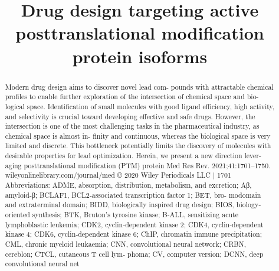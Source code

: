 \title{Drug design targeting active posttranslational modification protein isoforms}

\maketitle

\begin{abstract}
Modern drug design aims to discover novel lead com- pounds with attractable chemical profiles to enable further exploration of the intersection of chemical space and bio- logical space. Identification of small molecules with good ligand efficiency, high activity, and selectivity is crucial toward developing effective and safe drugs. However, the intersection is one of the most challenging tasks in the pharmaceutical industry, as chemical space is almost in- finity and continuous, whereas the biological space is very limited and discrete. This bottleneck potentially limits the discovery of molecules with desirable properties for lead optimization. Herein, we present a new direction lever- aging posttranslational modification (PTM) protein Med Res Rev. 2021;41:1701–1750. wileyonlinelibrary.com/journal/med © 2020 Wiley Periodicals LLC | 1701 Abbreviations: ADME, absorption, distribution, metabolism, and excretion; Aβ, amyloid‐β; BCLAF1, BCL2‐associated transcription factor 1; BET, bro- modomain and extraterminal domain; BIDD, biologically inspired drug design; BIOS, biology‐oriented synthesis; BTK, Bruton's tyrosine kinase; B‐ALL, sensitizing acute lymphoblastic leukemia; CDK2, cyclin‐dependent kinase 2; CDK4, cyclin‐dependent kinase 4; CDK6, cyclin‐dependent kinase 6; ChIP, chromatin immune precipitation; CML, chronic myeloid leukaemia; CNN, convolutional neural network; CRBN, cereblon; CTCL, cutaneous T cell lym- phoma; CV, computer version; DCNN, deep convolutional neural net
\end{abstract}


